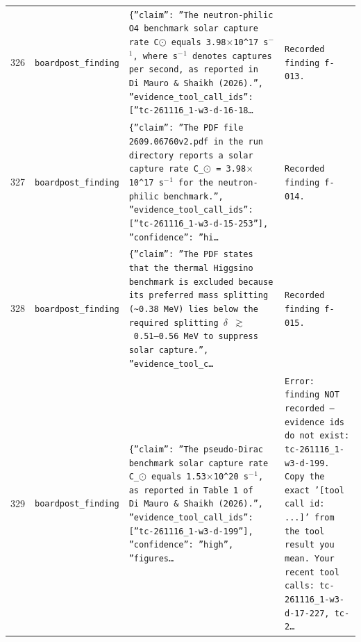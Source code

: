 \documentclass[11pt,a4paper]{article}
\begin{document}
\begin{longtable}{@{}p{}p{}p{}p{}@{}}
326 & \texttt{board}\newline\texttt{post\_\allowbreak{}finding} & \texttt{\{''claim'':\allowbreak{} ''The neutron-philic O4 benchmark solar capture rate C$\odot$ equals 3.98$\times$10\textasciicircum{}\allowbreak{}17 s$^-$$^1$,\allowbreak{} where s$^-$$^1$ denotes captures per second,\allowbreak{} as reported in Di~Mauro~\&~Shaikh (2026)\allowbreak{}.'',\allowbreak{} ''evidence\_\allowbreak{}tool\_\allowbreak{}call\_\allowbreak{}ids'':\allowbreak{} [''tc-261116\_\allowbreak{}1-w3-d-16-18\ldots{}\allowbreak{}} & \texttt{Recorded finding f-013.} \\
327 & \texttt{board}\newline\texttt{post\_\allowbreak{}finding} & \texttt{\{''claim'':\allowbreak{} ''The PDF file 2609.06760v2.pdf in the run directory reports a solar capture rate C\_\allowbreak{}$\odot$ =\allowbreak{} 3.98$\times$10\textasciicircum{}\allowbreak{}17~s$^-$$^1$ for the neutron-philic benchmark.'',\allowbreak{} ''evidence\_\allowbreak{}tool\_\allowbreak{}call\_\allowbreak{}ids'':\allowbreak{} [''tc-261116\_\allowbreak{}1-w3-d-15-253'']\allowbreak{},\allowbreak{} ''confidence'':\allowbreak{} ''hi\ldots{}\allowbreak{}} & \texttt{Recorded finding f-014.} \\
328 & \texttt{board}\newline\texttt{post\_\allowbreak{}finding} & \texttt{\{''claim'':\allowbreak{} ''The PDF states that the thermal Higgsino benchmark is excluded because its preferred mass splitting (\textasciitilde{}\allowbreak{}0.38~MeV)\allowbreak{} lies below the required splitting $\delta$~$\gtrsim$~0.51--0.56~MeV to suppress solar capture.'',\allowbreak{} ''evidence\_\allowbreak{}tool\_\allowbreak{}c\ldots{}\allowbreak{}} & \texttt{Recorded finding f-015.} \\
329 & \texttt{board}\newline\texttt{post\_\allowbreak{}finding} & \texttt{\{''claim'':\allowbreak{} ''The pseudo-Dirac benchmark solar capture rate C\_\allowbreak{}$\odot$ equals 1.53$\times$10\textasciicircum{}\allowbreak{}20 s$^-$$^1$,\allowbreak{} as reported in Table~1 of Di~Mauro~\&~Shaikh (2026)\allowbreak{}.'',\allowbreak{} ''evidence\_\allowbreak{}tool\_\allowbreak{}call\_\allowbreak{}ids'':\allowbreak{} [''tc-261116\_\allowbreak{}1-w3-d-199'']\allowbreak{},\allowbreak{} ''confidence'':\allowbreak{} ''high'',\allowbreak{} ''figures\ldots{}\allowbreak{}} & \texttt{Error:\allowbreak{} finding NOT recorded --- evidence ids do not exist:\allowbreak{} tc-261116\_\allowbreak{}1-w3-d-199. Copy the exact '[tool call id:\allowbreak{} ...]\allowbreak{}' from the tool result you mean. Your recent tool calls:\allowbreak{} tc-261116\_\allowbreak{}1-w3-d-17-227,\allowbreak{} tc-2\ldots{}\allowbreak{}} \\

\end{longtable}
\end{document}
